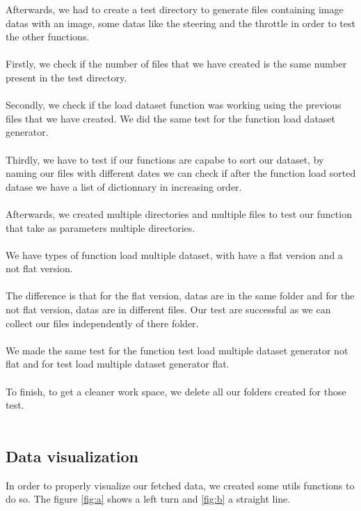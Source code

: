 \documentclass[12pt]{article}
\begin{document}
Afterwards, we had to create a test directory to generate files containing image datas with an image, some datas like the steering and the throttle in order to test the other functions. \\ \\

Firstly, we check if the number of files that we have created  is the same number present in the test directory. \\ \\

Secondly, we check if the load dataset function was working using the previous files that we have created. We did the same test for the function load dataset generator. \\ \\

Thirdly, we have to test if our functions are capabe to sort our dataset, by naming our files with different dates we can check if after the function load sorted datase we have a list of dictionnary in increasing order. \\ \\

Afterwards, we created multiple directories and multiple files to test our function that take as parameters multiple directories. \\ \\

We have types of function load multiple dataset, with have a flat version and a not flat version. \\ \\
The difference is that for the flat version, datas are in the same folder and for the not flat version, datas are in different files. Our test are successful as we can collect our files independently of there folder. \\ \\

We made the same test for the function test load multiple dataset generator not flat and for test load multiple dataset generator flat. \\ \\

To finish, to get a cleaner work space, we delete all our folders created for those test. \\ \\

\subsection{Data visualization}
In order to properly visualize our fetched data, we created some utils functions to do so.
The figure \ref{fig:a} shows a left turn and \ref{fig:b} a straight line.
\end{document}
